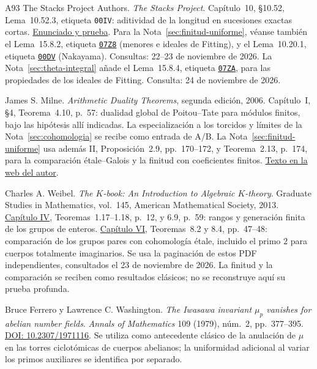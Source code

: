 \begin{thebibliography}{A93}
The Stacks Project Authors. \emph{The Stacks Project}.
Capítulo~10, §10.52, Lema~10.52.3, etiqueta \texttt{00IV}:
aditividad de la longitud en sucesiones exactas cortas.
\href{https://stacks.math.columbia.edu/tag/00IV}{Enunciado y prueba}.
Para la Nota~\ref{sec:finitud-uniforme}, véanse también
el Lema~15.8.2, etiqueta
\href{https://stacks.math.columbia.edu/tag/07Z8}{\texttt{07Z8}}
(menores e ideales de Fitting), y el Lema~10.20.1,
etiqueta \href{https://stacks.math.columbia.edu/tag/00DV}{\texttt{00DV}}
(Nakayama). Consultas: 22--23 de noviembre de 2026.
La Nota~\ref{sec:theta-integral} añade el Lema~15.8.4,
etiqueta \href{https://stacks.math.columbia.edu/tag/07ZA}{\texttt{07ZA}},
para las propiedades de los ideales de Fitting.
Consulta: 24 de noviembre de 2026.

James S. Milne. \emph{Arithmetic Duality Theorems}, segunda edición,
2006. Capítulo~I, §4, Teorema~4.10, p.~57:
dualidad global de Poitou--Tate para módulos finitos, bajo las
hipótesis allí indicadas. La especialización a los torcidos y límites
de la Nota~\ref{sec:cohomologia} se recibe como entrada de A/B.
La Nota~\ref{sec:finitud-uniforme} usa además II,
Proposición~2.9, pp.~170--172, y Teorema~2.13, p.~174,
para la comparación étale--Galois y la finitud con coeficientes finitos.
\href{https://www.jmilne.org/math/Books/ADTnot.pdf}{Texto en la web del autor}.

Charles A. Weibel. \emph{The $K$-book: An Introduction to Algebraic
$K$-theory}. Graduate Studies in Mathematics, vol.~145,
American Mathematical Society, 2013.
\href{https://sites.math.rutgers.edu/~weibel/Kbook/Kbook.IV.pdf}{Capítulo IV},
Teoremas~1.17--1.18, p.~12, y 6.9, p.~59:
rangos y generación finita de los grupos de enteros.
\href{https://sites.math.rutgers.edu/~weibel/Kbook/Kbook.VI.pdf}{Capítulo VI},
Teoremas~8.2 y 8.4, pp.~47--48: comparación de los grupos pares
con cohomología étale, incluido el primo $2$ para cuerpos
totalmente imaginarios. Se usa la paginación de estos PDF
independientes, consultados el 23 de noviembre de 2026.
La finitud y la comparación se reciben como resultados clásicos;
no se reconstruye aquí su prueba profunda.

Bruce Ferrero y Lawrence C. Washington.
\emph{The Iwasawa invariant $\mu_p$ vanishes for abelian number fields}.
\emph{Annals of Mathematics} 109 (1979), núm.~2, pp.~377--395.
\href{https://doi.org/10.2307/1971116}{DOI: 10.2307/1971116}.
Se utiliza como antecedente clásico de la anulación de $\mu$ en
las torres ciclotómicas de cuerpos abelianos; la uniformidad adicional
al variar los primos auxiliares se identifica por separado.

\end{thebibliography}

